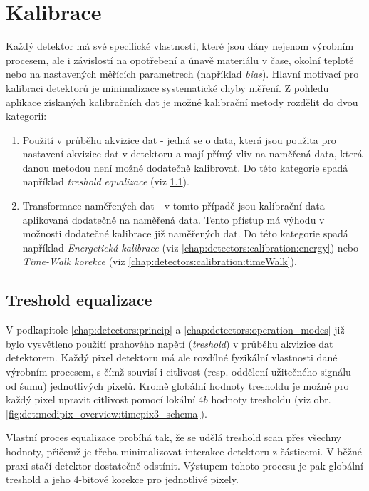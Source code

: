 \section{Kalibrace}\label{chap:detectors:calibration}
Každý detektor má své specifické vlastnosti, které jsou dány nejenom výrobním procesem, ale i závislostí na opotřebení a únavě materiálu v čase, okolní teplotě nebo na nastavených měřících parametrech (například \textit{bias}). Hlavní motivací pro kalibraci detektorů je minimalizace systematické chyby měření. Z pohledu aplikace získaných kalibračních dat je možné kalibrační metody rozdělit do dvou kategorií:
\begin{enumerate}[label=(\roman*)]
	\item Použití v průběhu akvizice dat - jedná se o data, která jsou použita pro nastavení akvizice dat v detektoru a mají přímý vliv na naměřená data, která danou metodou není možné dodatečně kalibrovat. Do této kategorie spadá například \textit{treshold equalizace} (viz \ref{chap:detectors:calibration:equalization}).
	\item Transformace naměřených dat - v tomto případě jsou kalibrační data aplikovaná dodatečně na naměřená data. Tento přístup má výhodu v možnosti dodatečné kalibrace již naměřených dat. Do této kategorie spadá například \textit{Energetická kalibrace} (viz \ref{chap:detectors:calibration:energy}) nebo \textit{Time-Walk korekce} (viz \ref{chap:detectors:calibration:timeWalk}).
\end{enumerate}

\subsection{Treshold equalizace}\label{chap:detectors:calibration:equalization}
V podkapitole \ref{chap:detectors:princip} a \ref{chap:detectors:operation_modes} již bylo vysvětleno použití prahového napětí (\textit{treshold}) v průběhu akvizice dat detektorem. Každý pixel detektoru má ale rozdílné fyzikální vlastnosti dané výrobním procesem, s čímž souvisí i citlivost (resp. oddělení užitečného signálu od šumu) jednotlivých pixelů. Kromě globální hodnoty tresholdu je možné pro každý pixel upravit citlivost pomocí lokální $4b$ hodnoty tresholdu (viz obr. \ref{fig:det:medipix_overview:timepix3_schema}).

Vlastní proces equalizace probíhá tak, že se udělá treshold scan přes všechny hodnoty, přičemž je třeba minimalizovat interakce detektoru z částicemi. V běžné praxi stačí detektor dostatečně odstínit. Výstupem tohoto procesu je pak globální treshold a jeho 4-bitové korekce pro jednotlivé pixely.

